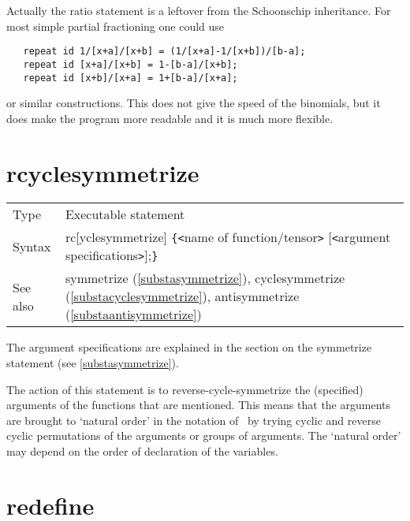 \noindent Actually the ratio statement is a leftover from the 
Schoonschip 
inheritance. For most simple partial fractioning one could use
\begin{verbatim}
   repeat id 1/[x+a]/[x+b] = (1/[x+a]-1/[x+b])/[b-a];
   repeat id [x+a]/[x+b] = 1-[b-a]/[x+b];
   repeat id [x+b]/[x+a] = 1+[b-a]/[x+a];
\end{verbatim}
or similar constructions. This does not give the speed of the 
binomials, but it does make the program more readable and 
it is much more flexible.
\vspace{10mm}

 
\section{rcyclesymmetrize}
\label{substarcyclesymmetrize}

\noindent \begin{tabular}{ll}
Type & Executable statement\\
Syntax & rc[yclesymmetrize] \verb:{:{\tt<}name of function/tensor{\tt>}
         [{\tt<}argument specifications{\tt>}];\verb:}: \\
See also & symmetrize (\ref{substasymmetrize}), cyclesymmetrize 
(\ref{substacyclesymmetrize}), antisymmetrize (\ref{substaantisymmetrize})
\end{tabular} \vspace{4mm}

\noindent The argument specifications are explained 
in the section on the symmetrize statement (see 
\ref{substasymmetrize}). \medskip

\noindent The action of this statement is to
reverse-cycle-symmetrize
 the (specified) arguments of the functions 
that are mentioned. This means that the arguments are brought to `natural 
order' in the notation of \FORM\ by trying cyclic and reverse cyclic 
permutations of the arguments or groups of arguments. 
The `natural order' may depend on the order of declaration of the 
variables. \vspace{10mm}


\section{redefine}
\label{substaredefine}

